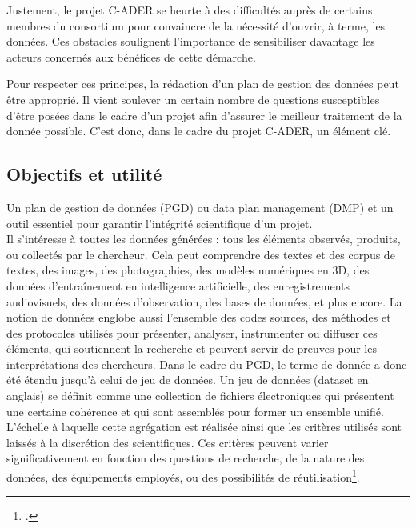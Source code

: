 Justement, le projet C-ADER se heurte à des difficultés auprès de certains membres du consortium pour convaincre de la nécessité d’ouvrir, à terme, les données. Ces obstacles soulignent l'importance de sensibiliser davantage les acteurs concernés aux bénéfices de cette démarche.


Pour respecter ces principes, la rédaction d’un plan de gestion des données peut être approprié. Il vient soulever un certain nombre de questions susceptibles d’être posées dans le cadre d’un projet afin d’assurer le meilleur traitement de la donnée possible. C'est donc, dans le cadre du projet C-ADER, un élément clé.

        \subsection{Objectifs et utilité} 

Un plan de gestion de données (PGD) ou data plan management (DMP) et un outil essentiel pour garantir l’intégrité scientifique d’un projet.\\

Il s'intéresse à toutes les données générées : tous les éléments observés, produits, ou collectés par le chercheur. Cela peut comprendre des textes et des corpus de textes, des images, des photographies, des modèles numériques en 3D, des données d’entraînement en intelligence artificielle, des enregistrements audiovisuels, des données d’observation, des bases de données, et plus encore. La notion de données englobe aussi l’ensemble des codes sources, des méthodes et des protocoles utilisés pour présenter, analyser, instrumenter ou diffuser ces éléments, qui soutiennent la recherche et peuvent servir de preuves pour les interprétations des chercheurs. Dans le cadre du PGD, le terme de donnée a donc été étendu jusqu’à celui de jeu de données. Un jeu de données (dataset en anglais) se définit comme une collection de fichiers électroniques qui présentent une certaine cohérence et qui sont assemblés pour former un ensemble unifié. L'échelle à laquelle cette agrégation est réalisée ainsi que les critères utilisés sont laissés à la discrétion des scientifiques. Ces critères peuvent varier significativement en fonction des questions de recherche, de la nature des données, des équipements employés, ou des possibilités de réutilisation\footcite{elisaCommentElaborerPlan2022}.\\

